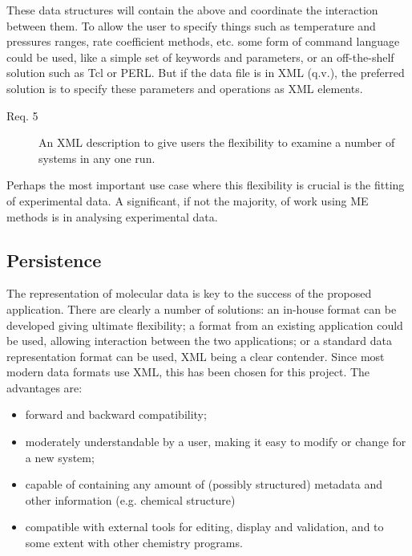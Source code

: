 These data structures will contain the above and coordinate the interaction between them. To allow the user to specify things such as temperature and pressures ranges, rate coefficient methods, etc. some form of command language could be used, like a simple set of keywords and parameters, or an off-the-shelf solution such as Tcl or PERL. But if the data file is in XML (q.v.), the preferred solution is to specify these parameters and operations as XML elements. 


\begin{description}
\item[Req. 5]{An XML description to give users the flexibility to examine a number of systems in any one run.}
\end{description}


Perhaps the most important use case where this flexibility is crucial is the fitting of experimental data. A significant, if not the majority, of work using ME methods is in analysing experimental data.

\subsection{Persistence}\label{sec:Persistence}


The representation of molecular data is key to the success of the proposed application. There are clearly a number of solutions: an in-house format can be developed giving ultimate flexibility; a format from an existing application could be used, allowing interaction between the two applications; or a standard data representation format can be used, XML being a clear contender. Since most modern data formats use XML, this has been chosen for this project. The advantages are: 
\begin{itemize}
  \item  forward and backward compatibility;
  \item  moderately understandable by a user, making it easy to modify or change for a new system;
  \item  capable of containing any amount of (possibly structured) metadata and other information (e.g. chemical structure)
  \item  compatible with external tools for editing, display and validation, and to some extent with other chemistry programs.
\end{itemize}

